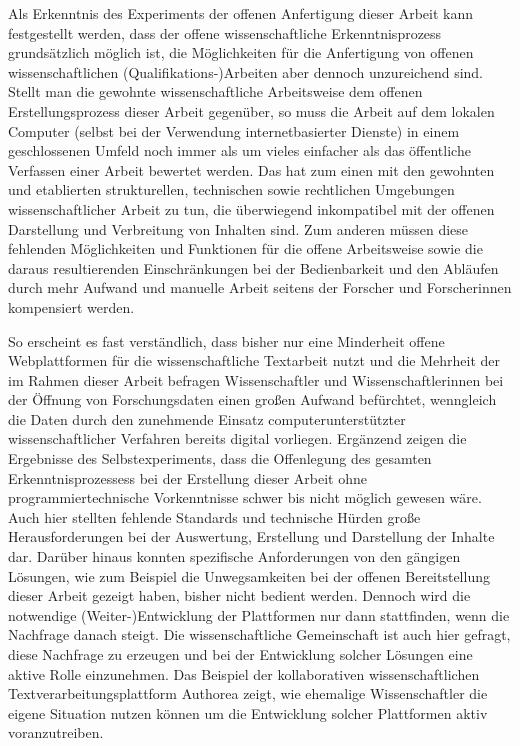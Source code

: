 Als Erkenntnis des Experiments der offenen Anfertigung dieser Arbeit kann festgestellt werden, dass der offene wissenschaftliche Erkenntnisprozess grundsätzlich möglich ist, die Möglichkeiten für die Anfertigung von offenen wissenschaftlichen (Qualifikations-)Arbeiten aber dennoch unzureichend sind. Stellt man die gewohnte wissenschaftliche Arbeitsweise dem offenen Erstellungsprozess dieser Arbeit gegenüber, so muss die Arbeit auf dem lokalen Computer (selbst bei der Verwendung internetbasierter Dienste) in einem geschlossenen Umfeld noch immer als um vieles einfacher als das öffentliche Verfassen einer Arbeit bewertet werden. Das hat zum einen mit den gewohnten und etablierten strukturellen, technischen sowie rechtlichen Umgebungen wissenschaftlicher Arbeit zu tun, die überwiegend inkompatibel mit der offenen Darstellung und Verbreitung von Inhalten sind. Zum anderen müssen diese fehlenden Möglichkeiten und Funktionen für die offene Arbeitsweise sowie die daraus resultierenden Einschränkungen bei der Bedienbarkeit und den Abläufen durch mehr Aufwand und manuelle Arbeit seitens der Forscher und Forscherinnen kompensiert werden.

So erscheint es fast verständlich, dass bisher nur eine Minderheit offene Webplattformen für die wissenschaftliche Textarbeit \cite{Perkel_2014} nutzt und die Mehrheit der im Rahmen dieser Arbeit befragen Wissenschaftler und Wissenschaftlerinnen bei der Öffnung von Forschungsdaten einen großen Aufwand befürchtet, wenngleich die Daten durch den zunehmende Einsatz computerunterstützter wissenschaftlicher Verfahren bereits digital vorliegen. Ergänzend zeigen die Ergebnisse des Selbstexperiments, dass die Offenlegung des gesamten Erkenntnisprozessess bei der Erstellung dieser Arbeit ohne programmiertechnische Vorkenntnisse schwer bis nicht möglich gewesen wäre. Auch hier stellten fehlende Standards und technische Hürden große Herausforderungen bei der Auswertung, Erstellung und Darstellung der Inhalte dar. Darüber hinaus konnten spezifische Anforderungen von den gängigen Lösungen, wie zum Beispiel die Un­weg­sam­keiten bei der offenen Bereitstellung dieser Arbeit gezeigt haben, bisher nicht bedient werden. Dennoch wird die notwendige (Weiter-)Entwicklung der Plattformen nur dann stattfinden, wenn die Nachfrage danach steigt. Die wissenschaftliche Gemeinschaft ist auch hier gefragt, diese Nachfrage zu erzeugen und bei der Entwicklung solcher Lösungen eine aktive Rolle einzunehmen. Das Beispiel der kollaborativen wissenschaftlichen Textverarbeitungsplattform Authorea zeigt, wie ehemalige Wissenschaftler die eigene Situation nutzen können um die Entwicklung solcher Plattformen aktiv voranzutreiben.

